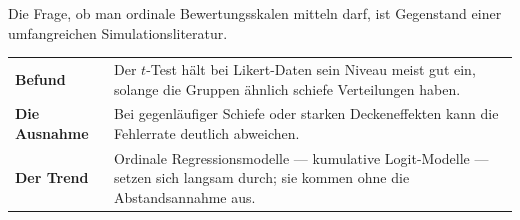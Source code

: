 \begin{forschung}
Die Frage, ob man ordinale Bewertungsskalen mitteln darf, ist Gegenstand einer umfangreichen Simulationsliteratur.

\begin{center}
{\small
\renewcommand{\arraystretch}{1.45}
\begin{tabular}{@{}P{2.8cm}P{5.4cm}@{}}
\toprule
\textbf{Befund} & Der $t$-Test hält bei Likert-Daten sein Niveau meist gut ein, solange die Gruppen ähnlich schiefe Verteilungen haben.\\
\textbf{Die Ausnahme} & Bei gegenläufiger Schiefe oder starken Deckeneffekten kann die Fehlerrate deutlich abweichen.\\
\textbf{Der Trend} & Ordinale Regressionsmodelle --- kumulative Logit-Modelle --- setzen sich langsam durch; sie kommen ohne die Abstandsannahme aus.\\
\bottomrule
\end{tabular}}
\end{center}

\begin{center}
\begin{minipage}{0.88\textwidth}
\end{minipage}
\end{center}
\end{forschung}

